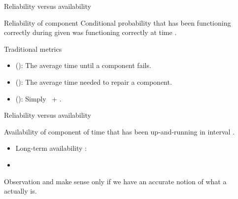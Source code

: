   \begin{slide}{Reliability versus availability}
    \begin{block}{Reliability  of component }
      Conditional probability that  has been functioning correctly during \mathexpr{[0,t)} given
         was functioning correctly at time .
    \end{block}

    \begin{block}{Traditional metrics}
      \begin{itemize}\tightlist
      \item {} (\blue{\MTTF}): The average time until a component fails.
      \item {} (\blue{\MTTR}): The average time needed to repair a component.
      \item {} (\blue{\MTBF}): Simply \MTTF\ + \MTTR.
      \end{itemize}
    \end{block}
  \end{slide}
  \begin{slide}{Reliability versus availability}
    \begin{block}{Availability  of component }
       of time that  has been up-and-running in interval \mathexpr{[0,t)}.

        \begin{itemize}
        \item Long-term availability : 
        \item {} 
        \end{itemize}
    \end{block}

    \begin{alertblock}{Observation}
       and  make sense only if we have an accurate notion of what a
       actually is.
    \end{alertblock}
  \end{slide}
